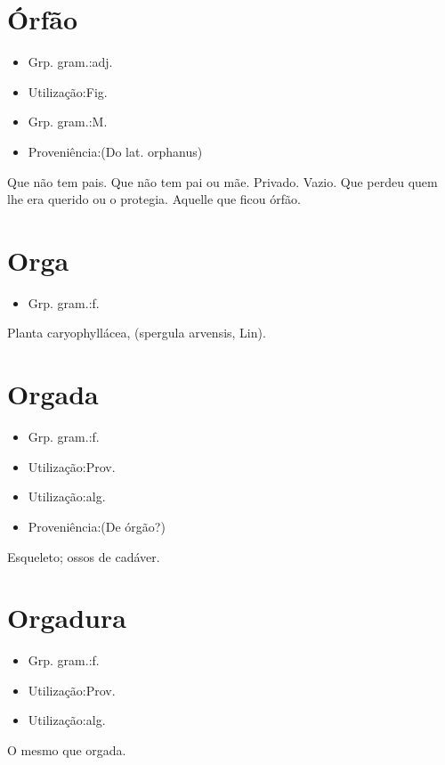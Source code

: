 \section{Órfão}
\begin{itemize}
\item {Grp. gram.:adj.}
\end{itemize}
\begin{itemize}
\item {Utilização:Fig.}
\end{itemize}
\begin{itemize}
\item {Grp. gram.:M.}
\end{itemize}
\begin{itemize}
\item {Proveniência:(Do lat. \textunderscore orphanus\textunderscore )}
\end{itemize}
Que não tem pais.
Que não tem pai ou mãe.
Privado.
Vazio.
Que perdeu quem lhe era querido ou o protegia.
Aquelle que ficou órfão.
\section{Orga}
\begin{itemize}
\item {Grp. gram.:f.}
\end{itemize}
Planta caryophyllácea, (\textunderscore spergula arvensis\textunderscore , Lin).
\section{Orgada}
\begin{itemize}
\item {Grp. gram.:f.}
\end{itemize}
\begin{itemize}
\item {Utilização:Prov.}
\end{itemize}
\begin{itemize}
\item {Utilização:alg.}
\end{itemize}
\begin{itemize}
\item {Proveniência:(De \textunderscore órgão\textunderscore ?)}
\end{itemize}
Esqueleto; ossos de cadáver.
\section{Orgadura}
\begin{itemize}
\item {Grp. gram.:f.}
\end{itemize}
\begin{itemize}
\item {Utilização:Prov.}
\end{itemize}
\begin{itemize}
\item {Utilização:alg.}
\end{itemize}
O mesmo que \textunderscore orgada\textunderscore .
